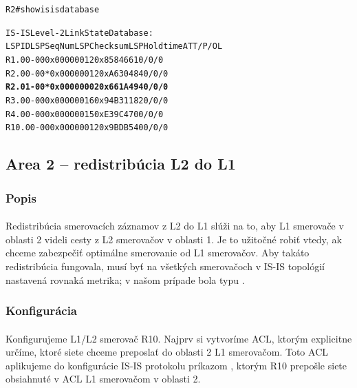 \documentclass[12pt,twoside,a4paper]{report}
\begin{document}
\noindent
{\selectfont
\begin{small}
\begin{alltt}
R2#show isis database

IS-IS Level-2 Link State Database:
LSPID                 LSP Seq Num  LSP Checksum  LSP Holdtime      ATT/P/OL
R1.00-00              0x00000012   0x8584        661               0/0/0
R2.00-00            * 0x00000012   0xA630        484               0/0/0
\textbf{R2.01-00            * 0x00000002   0x661A        494               0/0/0}
R3.00-00              0x00000016   0x94B3        1182              0/0/0
R4.00-00              0x00000015   0xE39C        470               0/0/0
R10.00-00             0x00000012   0x9BDB        540               0/0/0
\end{alltt}
\end{small}
}






\subsection{Area 2 – redistribúcia L2 do L1}
\subsubsection{Popis}
\paragraph{}
Redistribúcia smerovacích záznamov z L2 do L1 slúži na to, aby L1 smerovače v oblasti 2 videli cesty z L2 smerovačov v oblasti 1. Je to užitočné  robiť vtedy, ak chceme zabezpečiť optimálne smerovanie od L1 smerovačov. Aby takáto redistribúcia fungovala, musí byť na všetkých smerovačoch v IS-IS topológií nastavená rovnaká metrika; v našom prípade bola typu .

\subsubsection{Konfigurácia}
\paragraph{}
Konfigurujeme L1/L2 smerovač R10. Najprv si vytvoríme ACL, ktorým explicitne určíme, ktoré siete chceme preposlať do oblasti 2 L1 smerovačom. Toto ACL aplikujeme do konfigurácie IS-IS protokolu príkazom , ktorým R10 prepošle siete obsiahnuté v ACL L1 smerovačom v oblasti 2.
\end{document}
